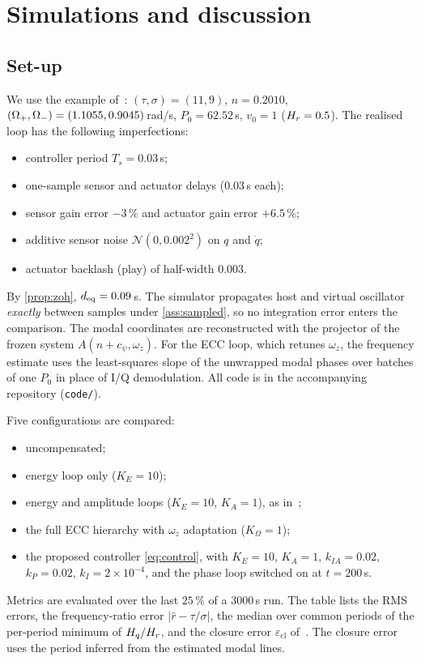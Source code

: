 \section{Simulations and discussion}\label{sec:sim}

\subsection{Set-up}
We use the example of~\citet{juchem2027restoring}: $(\tau,\sigma)=(11,9)$,
$n=0.2010$, $(\Omega_+,\Omega_-)=(1.1055,0.9045)$\,rad/s, $P_0=62.52$\,s, $v_0=1$
($H_r=0.5$).
The realised loop has the following imperfections:
\begin{itemize}
\item controller period $T_s=0.03$\,s;
\item one-sample sensor and actuator delays (0.03\,s each);
\item sensor gain error $-3\,\%$ and actuator gain error $+6.5\,\%$;
\item additive sensor noise $\mathcal N(0,0.002^2)$ on $q$ and $\dot q$;
\item actuator backlash (play) of half-width $0.003$.
\end{itemize}
By \cref{prop:zoh}, $d_{\mathrm{eq}}=0.09$\,s.
The simulator propagates host and virtual oscillator \emph{exactly} between
samples under \cref{ass:sampled}, so no integration error enters the
comparison.
The modal coordinates are reconstructed with the projector of the frozen system
$A(n+c_\psi,\omega_z)$.
For the ECC loop, which retunes $\omega_z$, the frequency estimate uses the
least-squares slope of the unwrapped modal phases over batches of one $P_0$ in
place of I/Q demodulation.
All code is in the accompanying repository (\texttt{code/}).

Five configurations are compared:
\begin{itemize}
\item uncompensated;
\item energy loop only ($K_E=10$);
\item energy and amplitude loops ($K_E=10$, $K_A=1$),
  as in~\citet{juchem2027restoring};
\item the full ECC hierarchy with $\omega_z$ adaptation ($K_\Omega=1$);
\item the proposed controller \eqref{eq:control}, with $K_E=10$, $K_A=1$,
  $k_{IA}=0.02$, $k_P=0.02$, $k_I=2\times10^{-4}$, and the phase loop switched
  on at $t=200$\,s.
\end{itemize}
Metrics are evaluated over the last $25\,\%$ of a $3000$\,s run.
The table lists the RMS errors, the frequency-ratio error $|\hat r-\tau/\sigma|$,
the median over common periods of the per-period minimum of $H_q/H_r$, and the
closure error $\varepsilon_{\mathrm{cl}}$ of~\citet{juchem2027restoring}.
The closure error uses the period inferred from the estimated modal lines.

